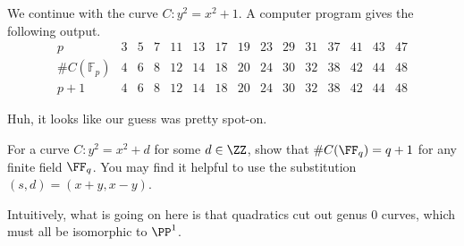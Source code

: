 \documentclass{article}
\begin{document}
\begin{example}
	We continue with the curve $C\colon y^2=x^2+1$. A computer program gives the following output.
	\[\begin{array}{c|ccccccccccccccccc}
		p & 3 & 5 & 7 & 11 & 13 & 17 & 19 & 23 & 29 & 31 & 37 & 41 & 43 & 47 \\\hline
		\#C(\mathbb F_p) & 4 & 6 & 8 & 12 & 14 & 18 & 20 & 24 & 30 & 32 & 38 & 42 & 44 & 48 \\
		p+1 & 4 & 6 & 8 & 12 & 14 & 18 & 20 & 24 & 30 & 32 & 38 & 42 & 44 & 48
	\end{array}\]
\end{example}
Huh, it looks like our guess was pretty spot-on.
\begin{exe}
	For a curve $C\colon y^2=x^2+d$ for some $d\in\ZZ$, show that $\#C(\FF_q)=q+1$ for any finite field $\FF_q$. You may find it helpful to use the substitution $(s,d)=(x+y,x-y)$.
\end{exe}
\begin{remark}
	Intuitively, what is going on here is that quadratics cut out genus $0$ curves, which must all be isomorphic to $\PP^1$.
\end{remark}
\end{document}
